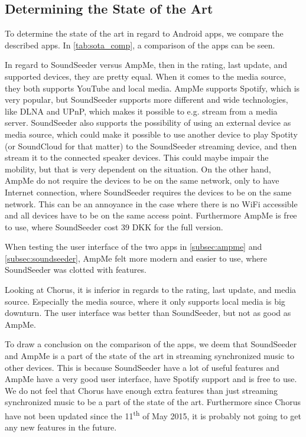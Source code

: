 \subsection{Determining the State of the Art}
To determine the state of the art in regard to Android apps, we compare the described apps.
In \cref{tab:sota_comp}, a comparison of the apps can be seen. 

In regard to SoundSeeder versus AmpMe, then in the rating, last update, and supported devices, they are pretty equal.
When it comes to the media source, they both supports YouTube and local media. 
AmpMe supports Spotify, which is very popular, but SoundSeeder supports more different and wide technologies,
like DLNA and UPnP, which makes it possible to e.g. stream from a media server.
SoundSeeder also supports the possibility of using an external device as media source,
which could make it possible to use another device to play Spotity (or SoundCloud for that matter) to the SoundSeeder streaming device,
and then stream it to the connected speaker devices. 
This could maybe impair the mobility, but that is very dependent on the situation.
On the other hand, AmpMe do not require the devices to be on the same network, only to have Internet connection,
where SoundSeeder requires the devices to be on the same network.
This can be an annoyance in the case where there is no WiFi accessible and all devices have to be on the same access point.
Furthermore AmpMe is free to use, where SoundSeeder cost 39 DKK for the full version.

When testing the user interface of the two apps in \cref{subsec:ampme} and \cref{subsec:soundseeder}, AmpMe felt more modern and easier to use,
where SoundSeeder was clotted with features.

Looking at Chorus, it is inferior in regards to the rating, last update, and media source.
Especially the media source, where it only supports local media is big downturn. 
The user interface was better than SoundSeeder, but not as good as AmpMe.

To draw a conclusion on the comparison of the apps,
we deem that SoundSeeder and AmpMe is a part of the state of the art in streaming synchronized music to other devices. 
This is because SoundSeeder have a lot of useful features and AmpMe have a very good user interface, have Spotify support and is free to use. 
We do not feel that Chorus have enough extra features than just streaming synchronized music to be a part of the state of the art.
Furthermore since Chorus have not been updated since the 11\textsuperscript{th} of May 2015,
it is probably not going to get any new features in the future.


